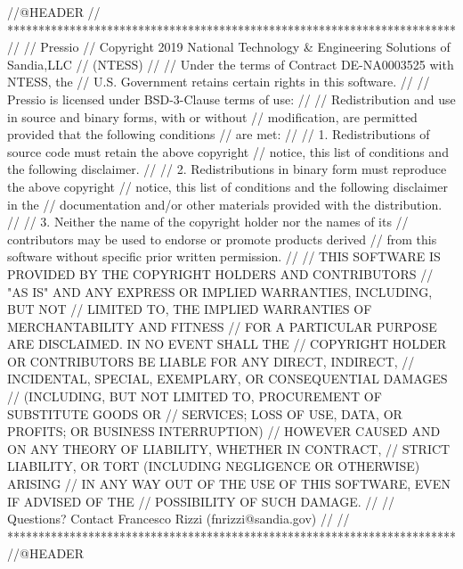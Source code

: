 
\begin{DoxyCode}
//@HEADER
// ************************************************************************
//
//                              Pressio
// Copyright 2019 National Technology & Engineering Solutions of Sandia,LLC
//                              (NTESS)
//
// Under the terms of Contract DE-NA0003525 with NTESS, the
// U.S. Government retains certain rights in this software.
//
// Pressio is licensed under BSD-3-Clause terms of use:
//
// Redistribution and use in source and binary forms, with or without
// modification, are permitted provided that the following conditions
// are met:
//
// 1. Redistributions of source code must retain the above copyright
// notice, this list of conditions and the following disclaimer.
//
// 2. Redistributions in binary form must reproduce the above copyright
// notice, this list of conditions and the following disclaimer in the
// documentation and/or other materials provided with the distribution.
//
// 3. Neither the name of the copyright holder nor the names of its
// contributors may be used to endorse or promote products derived
// from this software without specific prior written permission.
//
// THIS SOFTWARE IS PROVIDED BY THE COPYRIGHT HOLDERS AND CONTRIBUTORS
// "AS IS" AND ANY EXPRESS OR IMPLIED WARRANTIES, INCLUDING, BUT NOT
// LIMITED TO, THE IMPLIED WARRANTIES OF MERCHANTABILITY AND FITNESS
// FOR A PARTICULAR PURPOSE ARE DISCLAIMED. IN NO EVENT SHALL THE
// COPYRIGHT HOLDER OR CONTRIBUTORS BE LIABLE FOR ANY DIRECT, INDIRECT,
// INCIDENTAL, SPECIAL, EXEMPLARY, OR CONSEQUENTIAL DAMAGES
// (INCLUDING, BUT NOT LIMITED TO, PROCUREMENT OF SUBSTITUTE GOODS OR
// SERVICES; LOSS OF USE, DATA, OR PROFITS; OR BUSINESS INTERRUPTION)
// HOWEVER CAUSED AND ON ANY THEORY OF LIABILITY, WHETHER IN CONTRACT,
// STRICT LIABILITY, OR TORT (INCLUDING NEGLIGENCE OR OTHERWISE) ARISING
// IN ANY WAY OUT OF THE USE OF THIS SOFTWARE, EVEN IF ADVISED OF THE
// POSSIBILITY OF SUCH DAMAGE.
//
// Questions? Contact Francesco Rizzi (fnrizzi@sandia.gov)
//
// ************************************************************************
//@HEADER
\end{DoxyCode}
 